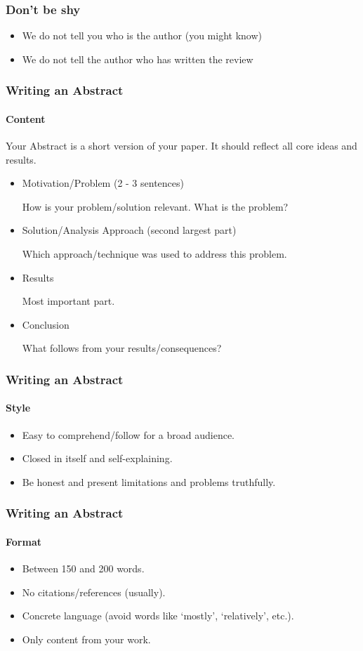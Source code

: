 \documentclass[xcolor={usenames,dvipsnames}]{beamer}
\begin{document}
\begin{frame}
	\frametitle{Don't be shy}
	\begin{itemize}
		\item We do not tell you who is the author (you might know)
		\item We do not tell the author who has written the review
	\end{itemize}

\end{frame}

\begin{frame}
	\frametitle{Writing an Abstract}
	\framesubtitle{Content}

	Your Abstract is a short version of your paper.
	It should reflect all core ideas and results.

	\medskip
			\begin{itemize}
				\item Motivation/Problem (2 - 3 sentences)

					How is your problem/solution relevant. What is the problem?
				\item Solution/Analysis Approach (second largest part)

					Which approach/technique was used to address this problem.
				\item Results

					Most important part.
				\item Conclusion

					What follows from your results/consequences?
			\end{itemize}
\end{frame}

\begin{frame}
	\frametitle{Writing an Abstract}
	\framesubtitle{Style}

	\begin{itemize}
		\item Easy to comprehend/follow for a broad audience.
		\item Closed in itself and self-explaining.
		\item Be honest and present limitations and problems truthfully.
	\end{itemize}

\end{frame}

\begin{frame}
	\frametitle{Writing an Abstract}
	\framesubtitle{Format}

	\begin{itemize}
		\item Between 150 and 200 words.
		\item No citations/references (usually).
		\item Concrete language (avoid words like `mostly', `relatively', etc.).
		\item Only content from your work.
	\end{itemize}

\end{frame}
\end{document}
